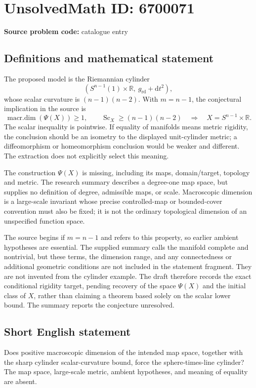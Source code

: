 \documentclass[11pt]{article}
\newcommand{\R}{\mathbb{R}}
\begin{document}
\section*{UnsolvedMath ID: 6700071}
\textbf{Source problem code:} catalogue entry
\subsection{Definitions and mathematical statement}
The proposed model is the Riemannian cylinder
\[
(S^{n-1}(1)\times\R,\ g_{\mathrm{rd}}+\mathrm dt^2),
\]
whose scalar curvature is \((n-1)(n-2)\). With \(m=n-1\), the conjectural implication in the source is
\[
\operatorname{macr.dim}(\Psi(X))\ge1,
\qquad \operatorname{Sc}_X\ge(n-1)(n-2)
\quad\Longrightarrow\quad X=S^{n-1}\times\R.
\]
The scalar inequality is pointwise. If equality of manifolds means metric rigidity, the conclusion should be an isometry to the displayed unit-cylinder metric; a diffeomorphism or homeomorphism conclusion would be weaker and different. The extraction does not explicitly select this meaning.

The construction \(\Psi(X)\) is missing, including its maps, domain/target, topology and metric. The research summary describes a degree-one map space, but supplies no definition of degree, admissible maps, or scale. Macroscopic dimension is a large-scale invariant whose precise controlled-map or bounded-cover convention must also be fixed; it is not the ordinary topological dimension of an unspecified function space.

The source begins if \(m=n-1\) and refers to this property, so earlier ambient hypotheses are essential. The supplied summary calls the manifold complete and nontrivial, but these terms, the dimension range, and any connectedness or additional geometric conditions are not included in the statement fragment. They are not invented from the cylinder example. The draft therefore records the exact conditional rigidity target, pending recovery of the space \(\Psi(X)\) and the initial class of \(X\), rather than claiming a theorem based solely on the scalar lower bound. The summary reports the conjecture unresolved.
\subsection{Short English statement}
Does positive macroscopic dimension of the intended map space, together with the sharp cylinder scalar-curvature bound, force the sphere-times-line cylinder? The map space, large-scale metric, ambient hypotheses, and meaning of equality are absent.
\end{document}
